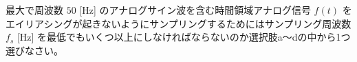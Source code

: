 最大で周波数 $50$ [Hz] のアナログサイン波を含む時間領域アナログ信号 $f(t)$ をエイリアシングが起きないようにサンプリングするためにはサンプリング周波数 $f_s$ [Hz] を最低でもいくつ以上にしなければならないのか選択肢a〜dの中から1つ選びなさい。
